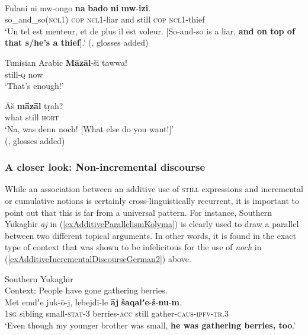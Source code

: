 \begin{exe}
	\ex {} \label{exAdditiveSwahili}\\
	\gll Fulani ni mw-ongo \textbf{na} \textbf{bado} \textbf{ni} \textbf{mw}-\textbf{izi}.\\
	so\_and\_so(\textsc{ncl}1) \textsc{cop} \textsc{ncl}1-liar and still \textsc{cop} \textsc{ncl}1-thief\\
	\glt \lq Un tel est menteur, et de plus il est voleur. [So-and-so is a liar, \textbf{and on top of that s/he's a thief}].’ (\cite[85]{Sacleux19391941}, glosses added)

	\ex 
	\begin{xlist}
		\exi{}Tunisian Arabic
		\ex\label{exAdditiveTunisian1}
		\gll \textbf{Māzāl}-ši tawwa!\\
		still-\textsc{q} now\\
		\glt \lq That's enough!\rq{ }\parencite{FischerEtAlTunisian}	
		
		\ex\label{exAdditiveTunisian2}
		\gll Āš \textbf{māzāl}  ṭṛah?\\
		what	still \textsc{hort}\\
		\glt \lq Na, was denn noch! [What else do you want!]\rq
		\\(\cite[650]{Singer1984}, glosses added)
	\end{xlist}	
\end{exe}

\subsubsection{A closer look: Non-incremental discourse} While an association between an additive use of \textsc{still} expressions and incremental or cumulative notions is certainly cross-linguistically recurrent, it is important to point out that this is far from a universal pattern. For instance, Southern Yukaghir \textit{āj} in (\ref{exAdditiveParallelismKolyma}) is clearly used to draw a parallel between two different topical arguments. In other words, it is found in the exact type of context that was shown to be infelicitous for the use of  \textit{noch} in (\ref{exAdditiveIncrementalDiscourseGerman2}) above. 

\begin{exe}
	\ex Southern Yukaghir\label{exAdditiveParallelismKolyma}\\
	Context: People have gone gathering berries.\\
	\gll Met emdʼe juk-ō-j, lebejdī-le \textbf{āj} \textbf{šaqalʼe}-\textbf{š}-\textbf{nu}-\textbf{m}.\\
	1\textsc{sg} sibling small-\textsc{stat}-3 berries-\textsc{acc} still gather-\textsc{caus}-\textsc{ipfv}-\textsc{tr}.3\\
	\glt \lq Even though my younger brother was small, \textbf{he was gathering berries, too}.' \parencite[146, 160]{YukaghirTexts}
\end{exe}

